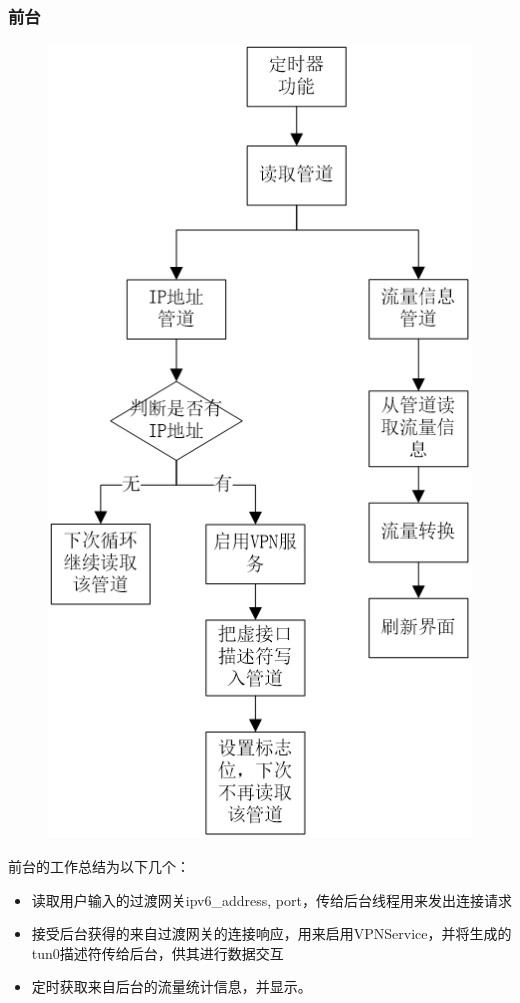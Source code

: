 \documentclass[paper=a4, fontsize=11pt, UTF8]{article} %
\begin{document}
\subsubsection{前台}
\begin{figure}[H]
    \centering
    \includegraphics[scale=0.7]{photos/front.png}
\end{figure}
前台的工作总结为以下几个：
\begin{itemize}
    \item 读取用户输入的过渡网关ipv6\_address, port，传给后台线程用来发出连接请求
    \item 接受后台获得的来自过渡网关的连接响应，用来启用VPNService，并将生成的tun0描述符传给后台，供其进行数据交互
    \item 定时获取来自后台的流量统计信息，并显示。
\end{itemize}
\end{document}
